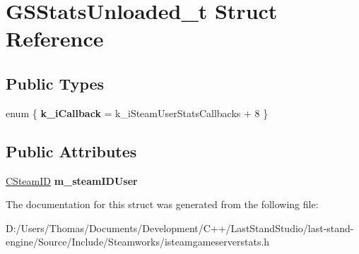 \hypertarget{structGSStatsUnloaded__t}{}\section{G\+S\+Stats\+Unloaded\+\_\+t Struct Reference}
\label{structGSStatsUnloaded__t}
\subsection*{Public Types}
\begin{DoxyCompactItemize}
\item 
\hypertarget{structGSStatsUnloaded__t_a5d2431639b03411f51826bb6047db658}{}enum \{ {\bfseries k\+\_\+i\+Callback} = k\+\_\+i\+Steam\+User\+Stats\+Callbacks + 8
 \}\label{structGSStatsUnloaded__t_a5d2431639b03411f51826bb6047db658}

\end{DoxyCompactItemize}
\subsection*{Public Attributes}
\begin{DoxyCompactItemize}
\item 
\hypertarget{structGSStatsUnloaded__t_a5667f0651a5864239265b66ba982e513}{}\hyperlink{classCSteamID}{C\+Steam\+I\+D} {\bfseries m\+\_\+steam\+I\+D\+User}\label{structGSStatsUnloaded__t_a5667f0651a5864239265b66ba982e513}

\end{DoxyCompactItemize}


The documentation for this struct was generated from the following file\+:\begin{DoxyCompactItemize}
\item 
D\+:/\+Users/\+Thomas/\+Documents/\+Development/\+C++/\+Last\+Stand\+Studio/last-\/stand-\/engine/\+Source/\+Include/\+Steamworks/isteamgameserverstats.\+h\end{DoxyCompactItemize}
